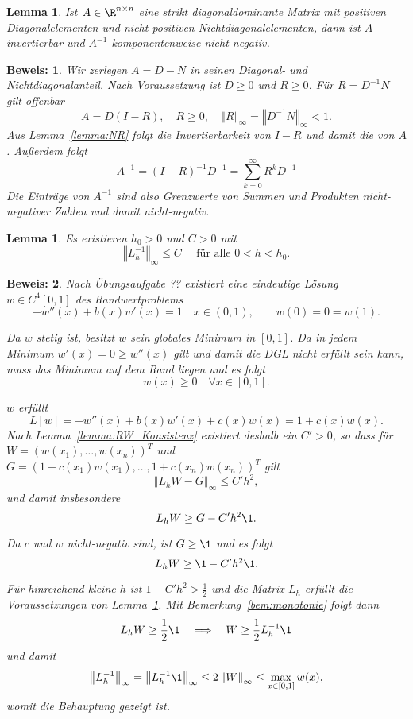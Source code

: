 \documentclass[
]{mycourse}
\theoremstyle{mythm}
\newtheorem{lemma}[theorem]{Lemma}
\theoremstyle{break}
\newtheorem*{beweis}{Beweis:}
\newcommand{\norm}[1]{\left\Vert#1\right\Vert}		%
\begin{document}
\begin{lemma}\label{lemma:wann_M}
Ist $A\in \R^{n\times n}$ eine strikt diagonaldominante Matrix mit positiven Diagonalelementen und nicht-positiven Nichtdiagonalelementen, dann ist $A$ invertierbar und $A^{-1}$ komponentenweise nicht-negativ.
\end{lemma}
\begin{beweis}
Wir zerlegen $A=D-N$ in seinen Diagonal- und Nichtdiagonalanteil. Nach Voraussetzung ist $D\geq 0$ und $R\geq 0$. Für $R=D^{-1} N$ gilt offenbar
\[
A=D (I-R), \quad R\geq 0, \quad \norm{R}_\infty=\norm{D^{-1} N}_\infty<1.
\]
Aus Lemma~\ref{lemma:NR} folgt die Invertierbarkeit von $I-R$ und damit die von $A$.
Außerdem folgt
\[
A^{-1}=(I-R)^{-1} D^{-1} =\sum_{k=0}^\infty {R^k} D^{-1}
\]
Die Einträge von $A^{-1}$ sind also Grenzwerte von Summen und Produkten nicht-negativer Zahlen und damit nicht-negativ.
\end{beweis}


\begin{lemma}\label{lemma:RW_stabil}
Es existieren $h_0>0$ und $C>0$ mit 
\[
\norm{L_h^{-1}}_\infty\leq C \quad \mbox{ für alle } 0<h<h_0.
\]
\end{lemma}
\begin{beweis}
Nach Übungsaufgabe ?? existiert eine eindeutige Lösung $w\in C^4[0,1]$ des Randwertproblems
\[
-w''(x) + b(x)w'(x) = 1 \quad x\in (0,1), \qquad w(0)=0=w(1).
\]

Da $w$ stetig ist, besitzt $w$ sein globales Minimum in $[0,1]$. Da in jedem Minimum $w'(x)=0\geq w''(x)$
gilt und damit die DGL nicht erfüllt sein kann, muss das Minimum auf dem Rand liegen und es folgt
\[
w(x)\geq 0 \quad \forall x\in [0,1].
\]


$w$ erfüllt
\[
L[w]=-w''(x) + b(x)w'(x) + c(x)w(x)= 1+c(x)w(x).
\]
Nach Lemma~\ref{lemma:RW_Konsistenz} existiert deshalb ein $C'>0$, so dass für 
$W=(w(x_1),\ldots,w(x_{n}))^T$ 
und $G=(1+c(x_1)w(x_1),\ldots,1+c(x_n)w(x_{n}))^T$ gilt
\[
\norm{L_h W - G}_\infty \leq C' h^2,
\]
und damit insbesondere
\[
L_h W \geq G- C'h^2 \1.
\]

Da $c$ und $w$ nicht-negativ sind, ist $G\geq \1$ und es folgt
\[
L_h W \geq \1 - C' h^2\1.
\]

Für hinreichend kleine $h$ ist $1-C'h^2>\frac{1}{2}$ und die Matrix 
$L_h$ erfüllt die Voraussetzungen von Lemma~\ref{lemma:wann_M}. Mit Bemerkung~\ref{bem:monotonie}
folgt dann
\[
L_h W\geq \frac{1}{2} \1 \quad \Longrightarrow \quad W\geq \frac{1}{2}{L_h^{-1}\1}
\]
und damit 
\[
\norm{L_h^{-1}}_\infty = \norm{L_h^{-1} \1}_\infty \leq 2 \norm{W}_\infty\leq \max_{x\in [0,1]} w(x),
\]
womit die Behauptung gezeigt ist.
\end{beweis}
\end{document}
